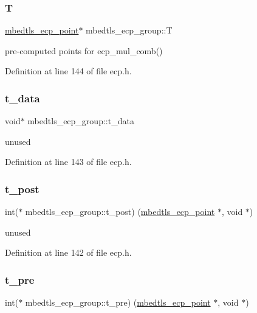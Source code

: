 \subsubsection{\texorpdfstring{T}{T}}
{\footnotesize\ttfamily \mbox{\hyperlink{structmbedtls__ecp__point}{mbedtls\+\_\+ecp\+\_\+point}}$\ast$ mbedtls\+\_\+ecp\+\_\+group\+::T}

pre-\/computed points for ecp\+\_\+mul\+\_\+comb() 

Definition at line 144 of file ecp.\+h.

\mbox{\label{structmbedtls__ecp__group_a7400fa2acba24d9b8a7a107d9fcde36f}} 
\subsubsection{\texorpdfstring{t\+\_\+data}{t\_data}}
{\footnotesize\ttfamily void$\ast$ mbedtls\+\_\+ecp\+\_\+group\+::t\+\_\+data}

unused 

Definition at line 143 of file ecp.\+h.

\mbox{\label{structmbedtls__ecp__group_aa67390761ba1d1f8b724d1550e451908}} 
\subsubsection{\texorpdfstring{t\+\_\+post}{t\_post}}
{\footnotesize\ttfamily int($\ast$ mbedtls\+\_\+ecp\+\_\+group\+::t\+\_\+post) (\mbox{\hyperlink{structmbedtls__ecp__point}{mbedtls\+\_\+ecp\+\_\+point}} $\ast$, void $\ast$)}

unused 

Definition at line 142 of file ecp.\+h.

\mbox{\label{structmbedtls__ecp__group_a2a4fbe0909b4feb994eaac95e1281cc6}} 
\subsubsection{\texorpdfstring{t\+\_\+pre}{t\_pre}}
{\footnotesize\ttfamily int($\ast$ mbedtls\+\_\+ecp\+\_\+group\+::t\+\_\+pre) (\mbox{\hyperlink{structmbedtls__ecp__point}{mbedtls\+\_\+ecp\+\_\+point}} $\ast$, void $\ast$)}

